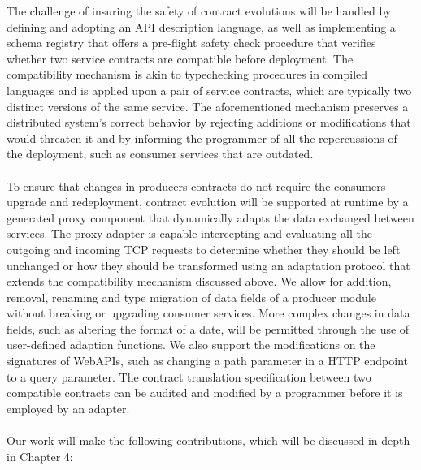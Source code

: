 The challenge of insuring the safety of contract evolutions will be handled by defining and adopting an API description language, as well as implementing a schema
registry that offers a pre-flight safety check procedure that verifies whether two service contracts are compatible before
deployment.
The compatibility mechanism is akin to typechecking procedures in compiled languages and is applied upon a
pair of service contracts, which are typically two distinct versions of the same service. The aforementioned mechanism preserves
a distributed system's correct behavior by rejecting additions or modifications that would threaten it and by informing the programmer
of all the repercussions of the deployment, such as consumer services that are outdated.

\paragraph{}

To ensure that changes in producers contracts do not require the consumers upgrade and redeployment, contract evolution
will be supported at runtime by a generated proxy component that dynamically adapts the data exchanged between services.
The proxy adapter is capable intercepting and evaluating all the outgoing and incoming TCP requests to determine whether
they should be left unchanged or how they should be transformed using an adaptation protocol that extends the compatibility mechanism discussed above.
We allow for addition, removal, renaming and type migration of data fields of a producer module without breaking or upgrading consumer services.
More complex changes in data fields, such as altering the format of a date, will be permitted through the use of user-defined adaption functions.
We also support the modifications on the signatures of WebAPIs, such as changing a path parameter in a HTTP endpoint to a query parameter.
The contract translation specification between two compatible contracts can be audited and modified by a programmer before it is employed by an adapter.

\paragraph{}

Our work will make the following contributions, which will be discussed in depth in Chapter 4:

